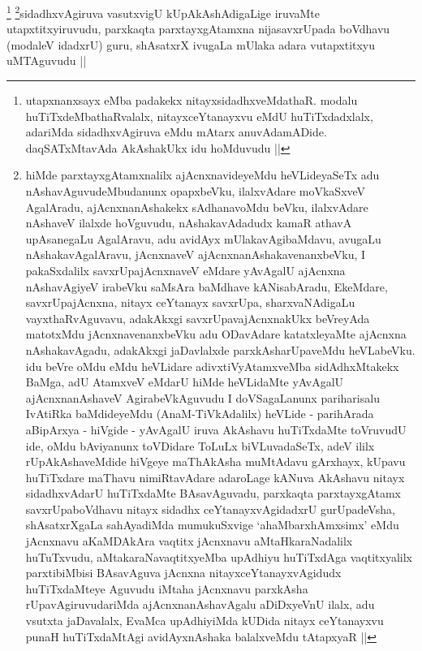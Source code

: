 \begin{artha}
\footnote{utapxnanxsayx eMba padakekx nitayxsidadhxveMdathaR. modalu
  huTiTxdeMbathaRvalalx, nitayxceYtanayxvu eMdU huTiTxdadxlalx,
  adariMda sidadhxvAgiruva eMdu mAtarx anuvAdamADide. daqSATxMtavAda
  AkAshakUkx idu hoMduvudu ||}
\footnote{hiMde parxtayxgAtamxnalilx ajAcnxnavideyeMdu heVLideyaSeTx
  adu nAshavAguvudeMbudanunx opapxbeVku, ilalxvAdare moVkaSxveV
  AgalAradu, ajAcnxnanAshakekx sAdhanavoMdu beVku, ilalxvAdare
  nAshaveV ilalxde hoVguvudu, nAshakavAdadudx kamaR athavA upAsanegaLu
  AgalAravu, adu avidAyx mUlakavAgibaMdavu, avugaLu nAshakavAgalAravu,
  jAcnxnaveV ajAcnxnanAshakavenanxbeVku, I pakaSxdalilx
  savxrUpajAcnxnaveV eMdare yAvAgalU ajAcnxna nAshavAgiyeV irabeVku
  saMsAra baMdhave kANisabAradu, EkeMdare, savxrUpajAcnxna, nitayx
  ceYtanayx savxrUpa, sharxvaNAdigaLu vayxthaRvAguvavu, adakAkxgi
  savxrUpavajAcnxnakUkx beVreyAda matotxMdu jAcnxnavenanxbeVku adu
  ODavAdare katatxleyaMte ajAcnxna nAshakavAgadu, adakAkxgi
  jaDavlalxde parxkAsharUpaveMdu heVLabeVku. idu beVre oMdu eMdu
  heVLidare adivxtiVyAtamxveMba sidAdhxMtakekx BaMga, adU AtamxveV
  eMdarU hiMde heVLidaMte yAvAgalU ajAcnxnanAshaveV AgirabeVkAguvudu
  I doVSagaLanunx pariharisalu  IvAtiRka baMdideyeMdu
  (AnaM-TiVkAdalilx) heVLide - parihArada aBipArxya - hiVgide -
  yAvAgalU iruva AkAshavu huTiTxdaMte toVruvudU ide, oMdu bAviyanunx
  toVDidare ToLuLx biVLuvadaSeTx, adeV ililx rUpAkAshaveMdide hiVgeye
  maThAkAsha muMtAdavu gArxhayx, kUpavu huTiTxdare maThavu
  nimiRtavAdare adaroLage kANuva AkAshavu nitayx sidadhxvAdarU
  huTiTxdaMte BAsavAguvadu, parxkaqta parxtayxgAtamx savxrUpaboVdhavu
  nitayx sidadhx ceYtanayxvAgidadxrU gurUpadeVsha, shAsatxrXgaLa
  sahAyadiMda mumukuSxvige `ahaMbarxhAmxsimx' eMdu jAcnxnavu
  aKaMDAkAra vaqtitx jAcnxnavu aMtaHkaraNadalilx huTuTxvudu,
  aMtakaraNavaqtitxyeMba upAdhiyu huTiTxdAga vaqtitxyalilx
  parxtibiMbisi BAsavAguva jAcnxna nitayxceYtanayxvAgidudx
  huTiTxdaMteye Aguvudu iMtaha jAcnxnavu parxkAsha rUpavAgiruvudariMda
  ajAcnxnanAshavAgalu aDiDxyeVnU ilalx, adu vsutxta jaDavalalx, EvaMca
  upAdhiyiMda kUDida nitayx ceYtanayxvu punaH huTiTxdaMtAgi
  avidAyxnAshaka balalxveMdu tAtapxyaR ||}sidadhxvAgiruva vasutxvigU kUpAkAshAdigaLige iruvaMte
utapxtitxyiruvudu, parxkaqta parxtayxgAtamxna nijasavxrUpada boVdhavu
(modaleV idadxrU) guru, shAsatxrX ivugaLa mUlaka adara vutapxtitxyu
uMTAguvudu ||
\end{artha}


